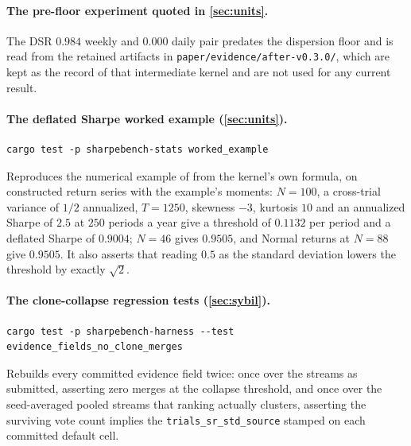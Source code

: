 \paragraph{The pre-floor experiment quoted in \cref{sec:units}.} The DSR $0.984$ weekly and $0.000$ daily pair predates the dispersion floor and is read from the retained artifacts in \texttt{paper/evidence/after-v0.3.0/}, which are kept as the record of that intermediate kernel and are not used for any current result.

\paragraph{The deflated Sharpe worked example (\cref{sec:units}).}
\begin{verbatim}
cargo test -p sharpebench-stats worked_example
\end{verbatim}
Reproduces the numerical example of \citet{bailey2014deflated} from the kernel's own formula, on constructed return series with the example's moments: $N=100$, a cross-trial variance of $1/2$ annualized, $T=1250$, skewness $-3$, kurtosis $10$ and an annualized Sharpe of $2.5$ at $250$ periods a year give a threshold of $0.1132$ per period and a deflated Sharpe of $0.9004$; $N=46$ gives $0.9505$, and Normal returns at $N=88$ give $0.9505$. It also asserts that reading $0.5$ as the standard deviation lowers the threshold by exactly $\sqrt{2}$.

\paragraph{The clone-collapse regression tests (\cref{sec:sybil}).}
\begin{verbatim}
cargo test -p sharpebench-harness --test evidence_fields_no_clone_merges
\end{verbatim}
Rebuilds every committed evidence field twice: once over the streams as submitted, asserting zero merges at the collapse threshold, and once over the seed-averaged pooled streams that ranking actually clusters, asserting the surviving vote count implies the \texttt{trials\_sr\_std\_source} stamped on each committed default cell.


